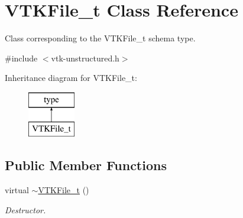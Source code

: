 \hypertarget{classVTKFile__t}{\section{V\+T\+K\+File\+\_\+t Class Reference}
\label{classVTKFile__t}
}


Class corresponding to the V\+T\+K\+File\+\_\+t schema type.  




{\ttfamily \#include $<$vtk-\/unstructured.\+h$>$}

Inheritance diagram for V\+T\+K\+File\+\_\+t\+:\begin{figure}[H]
\begin{center}
\leavevmode
\includegraphics[height=2.000000cm]{classVTKFile__t}
\end{center}
\end{figure}
\subsection*{Public Member Functions}
\begin{DoxyCompactItemize}
\item 
virtual \hyperlink{classVTKFile__t_ac5cf95c81660088dbb3c9ab6cd78dede}{$\sim$\+V\+T\+K\+File\+\_\+t} ()
\begin{DoxyCompactList}\small\item\em Destructor. \end{DoxyCompactList}\end{DoxyCompactItemize}
